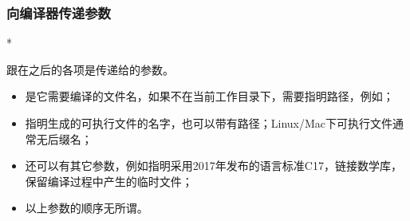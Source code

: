 \begin{frame}
    \frametitle{向编译器传递参数}
    \begin{Code}*
        
    \end{Code}
    跟在之后的各项是传递给的\alert{参数}。

    \begin{itemize}
        \item {}是它需要编译的文件名，如果不在当前工作目录下，需要指明路径，例如；
        \item {}指明生成的可执行文件的名字，也可以带有路径；Linux/Mac下可执行文件通常无后缀名；
        \item 还可以有其它参数，例如指明采用2017年发布的语言标准C17，链接数学库，保留编译过程中产生的临时文件；
        \item 以上参数的顺序无所谓。
    \end{itemize}
\end{frame}
